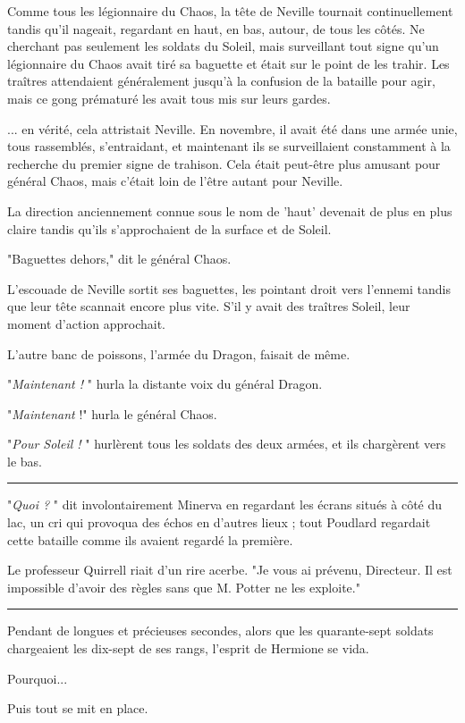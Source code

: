 Comme tous les légionnaire du Chaos, la tête de Neville tournait continuellement tandis qu'il nageait, regardant en haut, en bas, autour, de tous les côtés. Ne cherchant pas seulement les soldats du Soleil, mais surveillant tout signe qu'un légionnaire du Chaos avait tiré sa baguette et était sur le point de les trahir. Les traîtres attendaient généralement jusqu'à la confusion de la bataille pour agir, mais ce gong prématuré les avait tous mis sur leurs gardes.

... en vérité, cela attristait Neville. En novembre, il avait été dans une armée unie, tous rassemblés, s'entraidant, et maintenant ils se surveillaient constamment à la recherche du premier signe de trahison. Cela était peut-être plus amusant pour général Chaos, mais c'était loin de l'être autant pour Neville.

La direction anciennement connue sous le nom de 'haut' devenait de plus en plus claire tandis qu'ils s'approchaient de la surface et de Soleil.

"Baguettes dehors," dit le général Chaos.

L'escouade de Neville sortit ses baguettes, les pointant droit vers l'ennemi tandis que leur tête scannait encore plus vite. S'il y avait des traîtres Soleil, leur moment d'action approchait.

L'autre banc de poissons, l'armée du Dragon, faisait de même.

"\emph{Maintenant !} " hurla la distante voix du général Dragon.

"\emph{Maintenant}  !" hurla le général Chaos.

"\emph{Pour Soleil !} " hurlèrent tous les soldats des deux armées, et ils chargèrent vers le bas.
\par\noindent\rule{\textwidth}{0.4pt}
"\emph{Quoi ?} " dit involontairement Minerva en regardant les écrans situés à côté du lac, un cri qui provoqua des échos en d'autres lieux ; tout Poudlard regardait cette bataille comme ils avaient regardé la première.

Le professeur Quirrell riait d'un rire acerbe. "Je vous ai prévenu, Directeur. Il est impossible d'avoir des règles sans que M. Potter ne les exploite."
\par\noindent\rule{\textwidth}{0.4pt}
Pendant de longues et précieuses secondes, alors que les quarante-sept soldats chargeaient les dix-sept de ses rangs, l'esprit de Hermione se vida.

Pourquoi...

Puis tout se mit en place.


